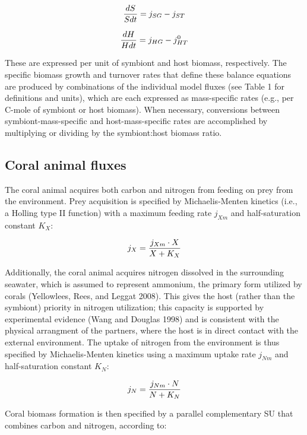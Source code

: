 \documentclass[]{elsarticle} %
\begin{document}
\begin{equation} {dS \over Sdt} = j_{SG} - j_{ST} \end{equation}

\begin{equation} {dH \over Hdt} = j_{HG} - j_{HT}^0 \end{equation}

These are expressed per unit of symbiont and host biomass, respectively.
The specific biomass growth and turnover rates that define these balance
equations are produced by combinations of the individual model fluxes
(see Table 1 for definitions and units), which are each expressed as
mass-specific rates (e.g., per C-mole of symbiont or host biomass). When
necessary, conversions between symbiont-mass-specific and
host-mass-specific rates are accomplished by multiplying or dividing by
the symbiont:host biomass ratio.

\subsection{Coral animal fluxes}\label{coral-animal-fluxes}

The coral animal acquires both carbon and nitrogen from feeding on prey
from the environment. Prey acquisition is specified by Michaelis-Menten
kinetics (i.e., a Holling type II function) with a maximum feeding rate
\(j_{Xm}\) and half-saturation constant \(K_X\):

\begin{equation} j_X = {{j_{Xm} \cdot X} \over {X + K_X}} \end{equation}

Additionally, the coral animal acquires nitrogen dissolved in the
surrounding seawater, which is assumed to represent ammonium, the
primary form utilized by corals (Yellowlees, Rees, and Leggat 2008).
This gives the host (rather than the symbiont) priority in nitrogen
utilization; this capacity is supported by experimental evidence (Wang
and Douglas 1998) and is consistent with the physical arrangment of the
partners, where the host is in direct contact with the external
environment. The uptake of nitrogen from the environment is thus
specified by Michaelis-Menten kinetics using a maximum uptake rate
\(j_{Nm}\) and half-saturation constant \(K_N\):

\begin{equation} j_N = {{j_{Nm} \cdot N} \over {N + K_N}} \end{equation}

Coral biomass formation is then specified by a parallel complementary SU
that combines carbon and nitrogen, according to:
\end{document}
